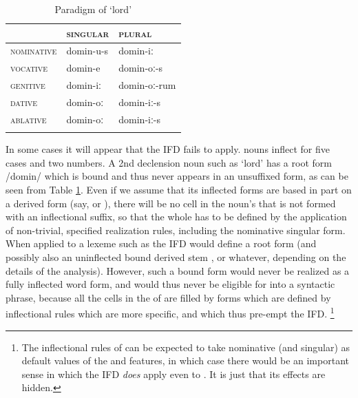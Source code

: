 \documentclass[output=paper,colorlinks,citecolor=brown]{langscibook}
\begin{document}
\begin{table}
	\begin{center}
		
		\begin{tabular}{lll}
			\lsptoprule
			&\textsc{singular}	&\textsc{plural}			\\
			\midrule
			\textsc{nominative}	&domin-u-s		&domin-iː			\\
			\textsc{vocative}	&domin-e			&domin-oː-s		\\
			\textsc{genitive}	&domin-iː			&domin-oː-rum		\\
			\textsc{dative}		&domin-oː			&domin-iː-s		\\
			\textsc{ablative}	&domin-oː			&domin-iː-s		\\
			\lspbottomrule
		\end{tabular}
	\vspace*{-0.5cm}
	\end{center}
	\caption{Paradigm of   `lord'} \label{tab:dominus}
\end{table}

In some cases it will appear that the IFD fails to apply.  nouns inflect for five cases and two numbers. A 2nd declension noun such as  `lord' has a root form /domin/ which is bound and thus never appears in an unsuffixed form, as can be seen from Table \ref{tab:dominus}. Even if we assume that its inflected forms are based in part on a derived  form (say,  or ), there will be no cell in the noun's  that is not formed with an inflectional suffix, so that the whole  has to be defined by the application of non-trivial, specified realization rules, including the nominative singular form. When applied to a lexeme such as  the IFD would define a root form  (and possibly also an uninflected bound derived stem ,  or whatever, depending on the details of the analysis). However, such a bound form would never be realized as a fully inflected word form, and would thus never be eligible for  into a syntactic phrase, because all the cells in the  of  are filled by forms which are defined by  inflectional rules which are more specific, and which thus pre-empt the IFD.%
\footnote{%
	The inflectional rules of  can be expected to take nominative  (and singular) as default values of the  and  features, in which case there would be  an important sense  in which the IFD \emph{does} apply even to . It is just that its effects are hidden.} %
\end{document}
